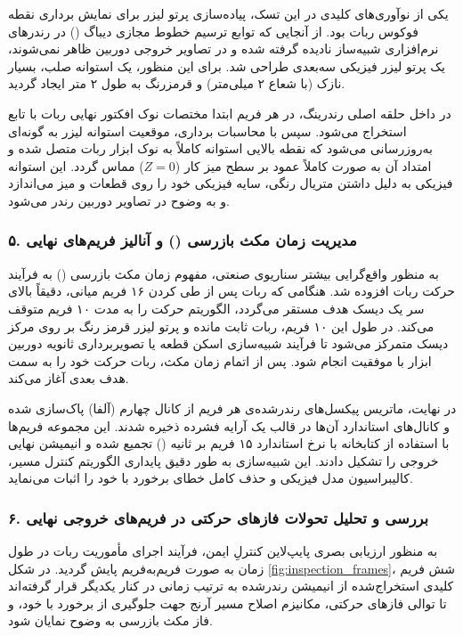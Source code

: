\documentclass{article}
\begin{document}
یکی از نوآوری‌های کلیدی در این تسک، پیاده‌سازی پرتو لیزر برای نمایش برداری نقطه فوکوس ربات بود. از آنجایی که توابع ترسیم خطوط مجازی دیباگ () در رندرهای نرم‌افزاری شبیه‌ساز نادیده گرفته شده و در تصاویر خروجی دوربین ظاهر نمی‌شوند، یک پرتو لیزر فیزیکی سه‌بعدی طراحی شد. برای این منظور، یک استوانه صلب، بسیار نازک (با شعاع ۲ میلی‌متر) و قرمزرنگ به طول ۲ متر ایجاد گردید. 

در داخل حلقه اصلی رندرینگ، در هر فریم ابتدا مختصات نوک افکتور نهایی ربات با تابع  استخراج می‌شود. سپس با محاسبات برداری، موقعیت استوانه لیزر به گونه‌ای به‌روزرسانی می‌شود که نقطه بالایی استوانه کاملاً به نوک ابزار ربات متصل شده و امتداد آن به صورت کاملاً عمود بر سطح میز کار ($Z=0$) مماس گردد. این استوانه فیزیکی به دلیل داشتن متریال رنگی، سایه فیزیکی خود را روی قطعات و میز می‌اندازد و به وضوح در تصاویر دوربین رندر می‌شود.

\subsubsection*{۵. مدیریت زمان مکث بازرسی () و آنالیز فریم‌های نهایی}

به منظور واقع‌گرایی بیشتر سناریوی صنعتی، مفهوم زمان مکث بازرسی () به فرآیند حرکت ربات افزوده شد. هنگامی که ربات پس از طی کردن ۱۶ فریم میانی، دقیقاً بالای سر یک دیسک هدف مستقر می‌گردد، الگوریتم حرکت را به مدت ۱۰ فریم متوقف می‌کند. در طول این ۱۰ فریم، ربات ثابت مانده و پرتو لیزر قرمز رنگ بر روی مرکز دیسک متمرکز می‌شود تا فرآیند شبیه‌سازی اسکن قطعه یا تصویربرداری ثانویه دوربین ابزار با موفقیت انجام شود. پس از اتمام زمان مکث، ربات حرکت خود را به سمت هدف بعدی آغاز می‌کند.

در نهایت، ماتریس پیکسل‌های رندرشده‌ی هر فریم از کانال چهارم (آلفا) پاک‌سازی شده و کانال‌های استاندارد  آن‌ها در قالب یک آرایه فشرده ذخیره شدند. این مجموعه فریم‌ها با استفاده از کتابخانه  با نرخ استاندارد ۱۵ فریم بر ثانیه () تجمیع شده و انیمیشن نهایی خروجی را تشکیل دادند. این شبیه‌سازی به طور دقیق پایداری الگوریتم کنترل مسیر، کالیبراسیون مدل فیزیکی و حذف کامل خطای برخورد با خود را اثبات می‌نماید.

\subsubsection*{۶. بررسی و تحلیل تحولات فازهای حرکتی در فریم‌های خروجی نهایی}

به منظور ارزیابی بصری پایپ‌لاین کنترلِ ایمن، فرآیند اجرای مأموریت ربات در طول زمان به صورت فریم‌به‌فریم پایش گردید. در شکل \ref{fig:inspection_frames}، شش فریم کلیدی استخراج‌شده از انیمیشن رندرشده به ترتیب زمانی در کنار یکدیگر قرار گرفته‌اند تا توالی فازهای حرکتی، مکانیزم اصلاح مسیر آرنج جهت جلوگیری از برخورد با خود، و فاز مکث بازرسی به وضوح نمایان شود.
\end{document}
